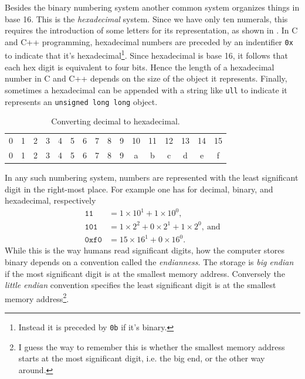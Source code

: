 Besides the binary numbering system another common system organizes things in
base 16. This is the {\it hexadecimal} system. Since we have only ten numerals,
this requires the introduction of some letters for its representation,
as shown in . In C and C++ programming,
hexadecimal numbers are preceded by an indentifier \texttt{0x} to
indicate that it's hexadecimal\footnote{Instead it is preceded
by \texttt{0b} if it's binary.}.
Since hexadecimal is base 16, it follows that each hex digit is equivalent
to four bits. Hence the length of a hexadecimal number in C and C++
depends on the size of the object it represents. Finally, sometimes
a hexadecimal can be appended with a string like \texttt{ull} to
indicate it represents an \texttt{unsigned long long} object. 

\begin{table}
\centering
\caption{Converting decimal to hexadecimal.}
\begin{tabularx}{\linewidth}{CCCCCCCCCCCCCCCC}
\hline{} & 1 & 2 & 3 & 4 & 5 & 6 & 7 & 8 & 9 & 10 & 11 & 12 & 13 & 14 & 15\\
0 & 1 & 2 & 3 & 4 & 5 & 6 & 7 & 8 & 9 & a & b & c & d & e & f\\
\hline\hline
\end{tabularx}
\label{tab:hexadecimal}
\end{table}

In any such numbering system, numbers are represented with the least significant
digit in the right-most place. For example one has for decimal, binary, and
hexadecimal, respectively
\begin{equation*}\begin{aligned}
  \texttt{11} &= 1\times10^1+1\times10^0, \\
  \texttt{101} &= 1\times2^2+0\times2^1+1\times2^0,~\text{and} \\
  \texttt{0xf0} &= 15\times16^1+0\times16^0.
\end{aligned}\end{equation*}
While this is the way humans read significant digits, how the computer stores
binary depends on a convention called the {\it endianness}.
The storage is {\it big endian}  if the most significant digit 
is at the smallest memory address. Conversely the
{\it little endian}  convention specifies the least
significant digit is at the smallest memory address\footnote{I guess the way
to remember this is whether the smallest memory address starts at the most
significant digit, i.e. the big end, or the other way around.}.

